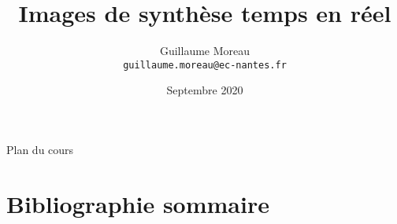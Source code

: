 \documentclass[allowframebreaks,xcolor=dvipsnames]{beamer}
\title[Option RV / IMAGRV] %
{Images de synthèse temps en réel}
\author[G. Moreau]{Guillaume Moreau\\
\texttt{guillaume.moreau@ec-nantes.fr}}
\institute[Ecole Centrale de Nantes] %
{
  Ecole Centrale de Nantes
}
\date %
{Septembre 2020}
\begin{document}
\begin{frame}
  \titlepage
\end{frame}

\begin{frame}[allowframebreaks]{Plan du cours}
  \tableofcontents[hideallsubsections]
\end{frame}














\section{Bibliographie sommaire}





\end{document}
